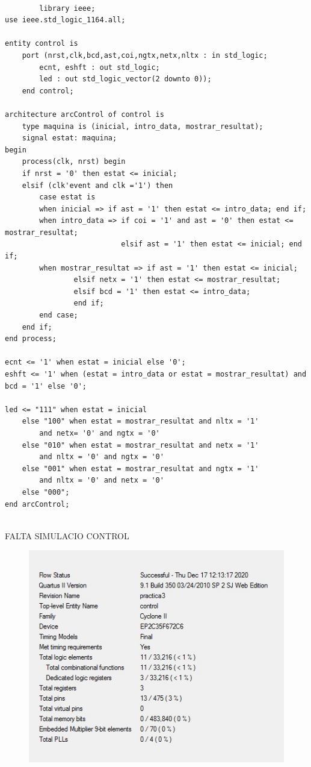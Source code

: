 \documentclass[12pt, a4papre]{article}
\begin{document}
		\begin{lstlisting}[style=vhdl, frame=single, basicstyle=\tiny]
		
		library ieee;
use ieee.std_logic_1164.all;

entity control is
	port (nrst,clk,bcd,ast,coi,ngtx,netx,nltx : in std_logic;
		ecnt, eshft : out std_logic;
		led : out std_logic_vector(2 downto 0));
	end control;

architecture arcControl of control is 
	type maquina is (inicial, intro_data, mostrar_resultat);
	signal estat: maquina;
begin
	process(clk, nrst) begin
	if nrst = '0' then estat <= inicial;
	elsif (clk'event and clk ='1') then
	    case estat is 
	    when inicial => if ast = '1' then estat <= intro_data; end if;
	    when intro_data => if coi = '1' and ast = '0' then estat <= mostrar_resultat;
						   elsif ast = '1' then estat <= inicial; end if;
	    when mostrar_resultat => if ast = '1' then estat <= inicial;
				elsif netx = '1' then estat <= mostrar_resultat;
				elsif bcd = '1' then estat <= intro_data;
				end if;
	    end case;
	end if;
end process;

ecnt <= '1' when estat = inicial else '0';
eshft <= '1' when (estat = intro_data or estat = mostrar_resultat) and bcd = '1' else '0';
			
led <= "111" when estat = inicial 
    else "100" when estat = mostrar_resultat and nltx = '1' 
        and netx= '0' and ngtx = '0'
    else "010" when estat = mostrar_resultat and netx = '1' 
    	and nltx = '0' and ngtx = '0'
    else "001" when estat = mostrar_resultat and ngtx = '1' 
    	and nltx = '0' and netx = '0'
    else "000";
end arcControl;
		
		\end{lstlisting}
		
		FALTA SIMULACIO CONTROL

	
	
	\begin{figure}[H]
		\begin{center}
		\includegraphics[width=130mm]{informeControl.jpeg}
		\end{center}
	\end{figure}	
		
\end{document}
